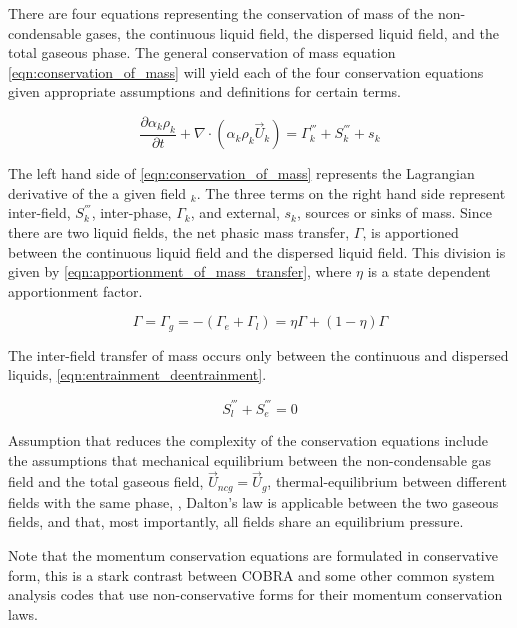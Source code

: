 There are four equations representing the conservation of mass of the non-condensable gases, the continuous liquid field, the dispersed liquid field, and the total gaseous phase.
The general conservation of mass equation \eqref{eqn:conservation_of_mass} will yield each of the four conservation equations given appropriate assumptions and definitions for certain terms.

\begin{equation}
\label{eqn:conservation_of_mass}
\frac{\partial \alpha_k \rho_k }{\partial t } + \nabla \cdot \left( \alpha_k \rho_k \vec{U}_k \right) = \Gamma^{'''}_k + S^{'''}_k + s_k
\end{equation}

The left hand side of \eqref{eqn:conservation_of_mass} represents the Lagrangian derivative of the a given field $_k$.
The three terms on the right hand side represent inter-field, $S^{'''}_k$, inter-phase, $\Gamma_k$,  and external, $s_k$, sources or sinks of mass.
Since there are two liquid fields, the net phasic mass transfer, $\Gamma$, is apportioned between the continuous liquid field and the dispersed liquid field.
This division is given by \eqref{eqn:apportionment_of_mass_transfer}, where $\eta$ is a state dependent apportionment factor.

\begin{equation}
\label{eqn:apportionment_of_mass_transfer}
\Gamma = \Gamma_g = -( \Gamma_e + \Gamma_l ) =  \eta \Gamma + (1 - \eta)\Gamma
\end{equation}

The inter-field transfer of mass occurs only between the continuous and dispersed liquids, \eqref{eqn:entrainment_deentrainment}.

\begin{equation}
\label{eqn:entrainment_deentrainment}
S^{'''}_l + S^{'''}_e = 0
\end{equation}

Assumption that reduces the complexity of the conservation equations include the assumptions that mechanical equilibrium between the non-condensable gas field and the total gaseous field, $\vec{U}_{ncg} = \vec{U}_g$, thermal-equilibrium between different fields with the same phase, $ $, Dalton's law is applicable between the two gaseous fields, and that, most importantly, all fields share an equilibrium pressure.

Note that the momentum conservation equations are formulated in conservative form, this is a stark contrast between COBRA and some other common system analysis codes \cite{TRACE, RELAP} that use non-conservative forms for their momentum conservation laws.


